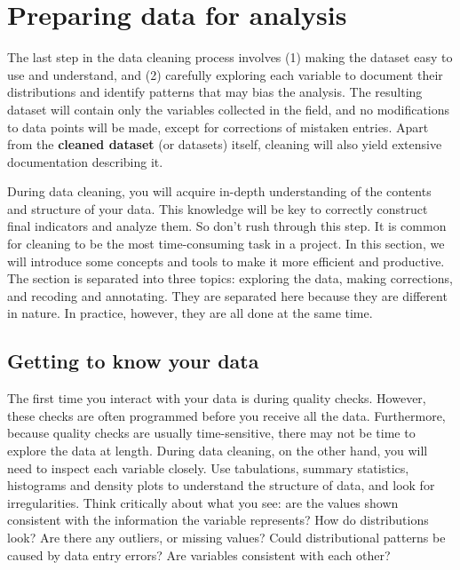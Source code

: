 \section{Preparing data for analysis}

The last step in the data cleaning process involves
(1) making the dataset easy to use and understand, and 
(2) carefully exploring each variable to document their distributions 
and identify patterns that may bias the analysis.
The resulting dataset will contain only the variables collected in the field, and
no modifications to data points will be made, 
except for corrections of mistaken entries.
Apart from the \textbf{cleaned dataset} (or datasets) itself,
cleaning will also yield extensive documentation describing  it.

During data cleaning, you will acquire in-depth understanding of the contents and structure of your data.
This knowledge will be key to correctly construct final indicators and analyze them.
So don't rush through this step.
It is common for cleaning to be the most time-consuming task in a project.
In this section, we will introduce some concepts and tools to make it more efficient and productive.
The section is separated into three topics:
exploring the data, making corrections, and recoding and annotating.
They are separated here because they are different in nature.
In practice, however, they are all done at the same time.


\subsection{Getting to know your data}

The first time you interact with your data is during quality checks.
However, these checks are often programmed before you receive all the data.
Furthermore, because quality checks are usually time-sensitive, 
there may not be time to explore the data at length.
During data cleaning, on the other hand, 
you will need to inspect each variable closely.
Use tabulations, summary statistics, histograms and density plots to understand the structure of data,
and look for irregularities.
Think critically about what you see:
are the values shown consistent with the information the variable represents?
How do distributions look? 
Are there any outliers, or missing values?
Could distributional patterns be caused by data entry errors?
Are variables consistent with each other?

